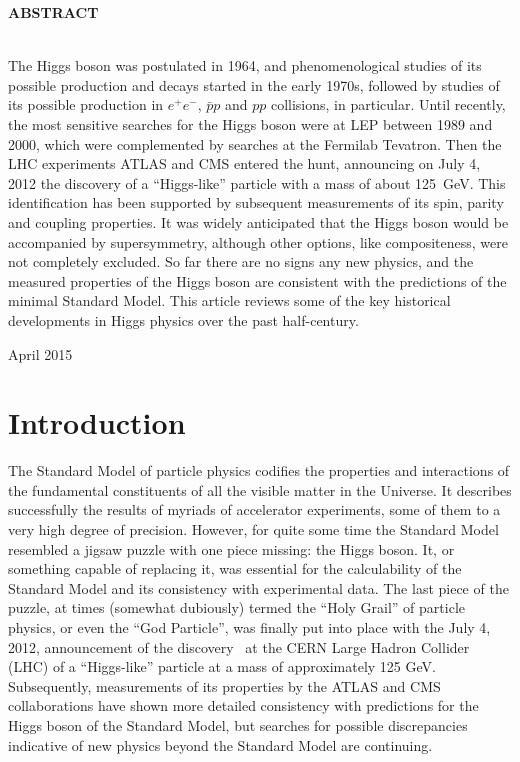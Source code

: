 \documentclass[12pt]{article}
\numberwithin{equation}{section}
\begin{document}
\centerline{\bf ABSTRACT}
~~\\
\noindent  
The Higgs boson was postulated in 1964, and phenomenological studies
of its possible production and decays started in the early 1970s,
followed by studies of its possible production in $e^+ e^-$, ${\bar p}
p$ and $pp$ collisions, in particular. Until recently, the most
sensitive searches for the Higgs boson were at LEP between 1989 and
2000, which were complemented by searches at the Fermilab
Tevatron. Then the LHC experiments ATLAS and CMS entered the hunt,
announcing on July 4, 2012 the discovery of a ``Higgs-like'' particle
with a mass of about 125~GeV. This identification has been supported
by subsequent measurements of its spin, parity and coupling properties.  It was
widely anticipated that the Higgs boson would be accompanied by
supersymmetry, although other options, like compositeness, were not
completely excluded. So far there are no signs any new physics, and
the measured properties of the Higgs boson are consistent with the
predictions of the minimal Standard Model. This article reviews some
of the key historical developments in Higgs physics over the past
half-century.

\vspace{0.7cm}
\begin{flushleft}
April 2015
\end{flushleft}


\newpage



\section{Introduction}

The Standard Model of particle physics codifies the properties and
interactions of the fundamental constituents of all the visible matter
in the Universe. It describes successfully the results of myriads of
accelerator experiments, some of them to a very high degree of
precision.  However, for quite some time the Standard Model resembled
a jigsaw puzzle with one piece missing: the Higgs boson. It, or
something capable of replacing it, was essential for the calculability
of the Standard Model and its consistency with experimental data.  The
last piece of the puzzle, at times (somewhat dubiously) termed the
``Holy Grail'' of particle physics, or even the ``God Particle'', was
finally put into place with the July 4, 2012, announcement of the
discovery~\cite{July4} at the CERN Large Hadron Collider (LHC) of a
``Higgs-like'' particle at a mass of approximately 125 GeV.
Subsequently, measurements of its properties by the ATLAS and CMS
collaborations have shown more detailed consistency with
predictions for the Higgs boson of the Standard Model, but searches for
possible discrepancies indicative of new physics beyond the Standard Model
are continuing.
\end{document}
